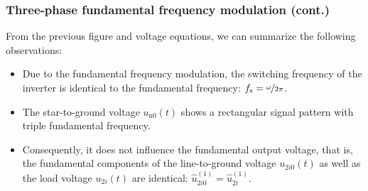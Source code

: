 \begin{frame}
    \frametitle{Three-phase fundamental frequency modulation (cont.)} 
    From the previous figure and voltage equations, we can summarize the following observations:
    \begin{itemize}
        \item<1-> Due to the fundamental frequency modulation, the switching frequency of the inverter is identical to the fundamental frequency: $f_{\mathrm{s}} = \nicefrac{\omega}{2\pi}$.
        \item<2-> The star-to-ground voltage $u_{\mathrm{n0}}(t)$ shows a rectangular signal pattern with triple fundamental frequency. 
        \item<3-> Consequently, it does not influence the fundamental output voltage, that is, the fundamental components of the line-to-ground voltage $u_{2i0}(t)$ as well as the load voltage $u_{2i}(t)$ are identical: $\hat{u}^{(1)}_{2i0}=\hat{u}^{(1)}_{2i}$.
    \end{itemize}\vspace{-0.25cm}
\end{frame}

